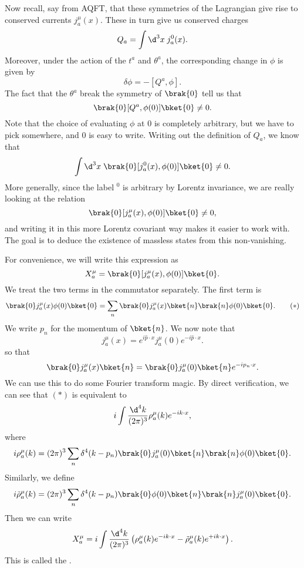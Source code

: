 \documentclass[a4paper]{article}
\begin{document}
Now recall, say from AQFT, that these symmetries of the Lagrangian give rise to conserved currents $j_a^\mu(x)$. These in turn give us conserved charges
\[
  Q_a = \int \d^3 x\; j^0_a (x).
\]
Moreover, under the action of the $t^a$ and $\theta^a$, the corresponding change in $\phi$ is given by
\[
  \delta \phi = -[Q^a, \phi].
\]
The fact that the $\theta^a$ break the symmetry of $\brak{0}$ tell us that
\[
  \brak{0}[Q^a, \phi(0)] \bket{0} \not= 0.
\]
Note that the choice of evaluating $\phi$ at $0$ is completely arbitrary, but we have to pick somewhere, and $0$ is easy to write. Writing out the definition of $Q_a$, we know that
\[
  \int \d^3 x\; \brak{0} [j_a^0(x), \phi(0)] \bket{0} \not= 0.
\]
More generally, since the label $^0$ is arbitrary by Lorentz invariance, we are really looking at the relation
\[
  \brak{0} [j_a^\mu (x), \phi(0)] \bket{0} \not= 0,
\]
and writing it in this more Lorentz covariant way makes it easier to work with. The goal is to deduce the existence of massless states from this non-vanishing.

For convenience, we will write this expression as
\[
  X_a^\mu = \brak{0} [j_a^\mu (x), \phi(0)] \bket{0}.
\]
We treat the two terms in the commutator separately. The first term is
\[
  \brak{0} j_a^\mu (x) \phi(0) \bket{0} = \sum_n \brak{0}j_a^\mu (x) \bket{n} \brak{n}\phi(0) \bket{0}.\tag{$*$}
\]
We write $p_n$ for the momentum of $\bket{n}$. We now note that
\[
  j_a^\mu (x) = e^{i\hat{p} \cdot x} j_a^\mu (0) e^{-i\hat{p} \cdot x}.
\]
so that
\[
  \brak{0}j_a^\mu(x) \bket{n} = \brak{0} j_a^\mu(0) \bket{n} e^{-ip_n \cdot x}.
\]
We can use this to do some Fourier transform magic. By direct verification, we can see that $(*)$ is equivalent to
\[
  i \int \frac{\d^4 k}{(2\pi)^3} \rho_a^\mu(k) e^{-ik\cdot x},
\]
where
\[
  i \rho_a^\mu (k) = (2\pi)^3 \sum_n \delta^4(k - p_n)\brak{0}j_a^\mu(0) \bket{n} \brak{n}\phi(0)\bket{0}.
\]
Similarly, we define
\[
  i \tilde{\rho}_a^\mu (k) = (2\pi)^3 \sum_n \delta^4(k - p_n) \brak{0} \phi(0) \bket{n} \brak{n} j_a^\mu (0) \bket{0}.
\]
Then we can write
\[
  X_a^\mu = i \int \frac{\d^4 k}{(2\pi)^3}\left(\rho_a^\mu (k) e^{-ik\cdot x} - \tilde{\rho}_a^\mu(k) e^{+ik\cdot x}\right).
\]
This is called the .
\end{document}

